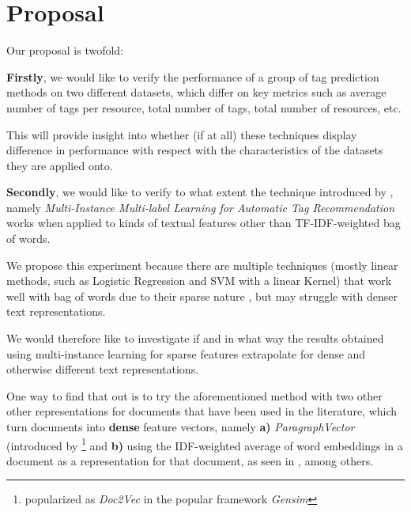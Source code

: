 \chapter{Proposal}\label{chap:proposal}

Our proposal is twofold:

\textbf{Firstly}, we would like to verify the performance of a group of tag prediction methods on two different datasets, which differ on key metrics such as average number of tags per resource, total number of tags, total number of resources, etc.

This will provide insight into whether (if at all)  these techniques display difference in performance with respect with the characteristics of the datasets they are applied onto.

\textbf{Secondly}, we would like to verify to what extent the technique introduced by \cite{shen_etal_2009}, namely \textit{Multi-Instance Multi-label Learning for Automatic Tag Recommendation} works when applied to kinds of textual features other than TF-IDF-weighted bag of words.

We propose this experiment because there are multiple techniques (mostly linear methods, such as Logistic Regression and SVM with a linear Kernel) that work well with bag of words due to their sparse nature \cite{hsu_etal_2010, li_etal_2015}, but may struggle with denser text representations.

We would therefore like to investigate if and in what way the results obtained using multi-instance learning for sparse features extrapolate for dense and otherwise different text representations.

One way to find that out is to try the aforementioned method with two other other representations for documents that have been used in the literature, which turn documents into \textbf{dense} feature vectors, namely \textbf{a)} \textit{ParagraphVector} (introduced by \cite{le_mikolov_2014} \footnote{popularized as \textit{Doc2Vec} in the popular framework \textit{Gensim}} and \textbf{b)} using the IDF-weighted average of word embeddings in a document as a representation for that document, as seen in \cite{zhao_etal_2015,correa_etal_2017}, among others.